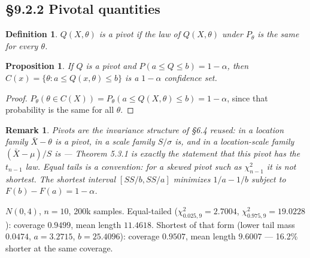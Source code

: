 \documentclass[11pt]{article}
\newtheorem{definition}[theorem]{Definition}
\newtheorem{remark}[theorem]{Remark}
\newtheorem{proposition}[theorem]{Proposition}
\begin{document}
\subsection{\S9.2.2 Pivotal quantities}
\begin{definition}
$Q(X,\theta)$ is a pivot if the law of $Q(X,\theta)$ under $P_\theta$ is the same for every $\theta$.
\end{definition}
\begin{proposition}
If $Q$ is a pivot and $P(a\le Q\le b)=1-\alpha$, then $C(x)=\{\theta:a\le Q(x,\theta)\le b\}$ is a $1-\alpha$ confidence set.
\end{proposition}
\begin{proof}
$P_\theta(\theta\in C(X))=P_\theta(a\le Q(X,\theta)\le b)=1-\alpha$, since that probability is the same for all $\theta$.
\end{proof}
\begin{remark}
Pivots are the invariance structure of \S6.4 reused: in a location family $\bar X-\theta$ is a pivot, in a scale family $S/\sigma$ is, and in a location-scale family $(\bar X-\mu)/S$ is --- Theorem 5.3.1 is exactly the statement that this pivot has the $t_{n-1}$ law. Equal tails is a convention: for a skewed pivot such as $\chi^2_{n-1}$ it is not shortest. The shortest interval $[SS/b,SS/a]$ minimizes $1/a-1/b$ subject to $F(b)-F(a)=1-\alpha$.
\end{remark}
\begin{simbox}
$N(0,4)$, $n=10$, 200k samples. Equal-tailed ($\chi^2_{0.025,9}=2.7004$, $\chi^2_{0.975,9}=19.0228$): coverage $0.9499$, mean length $11.4618$. Shortest of that form (lower tail mass $0.0474$, $a=3.2715$, $b=25.4096$): coverage $0.9507$, mean length $9.6007$ --- 16.2\% shorter at the same coverage.
\end{simbox}
\end{document}
